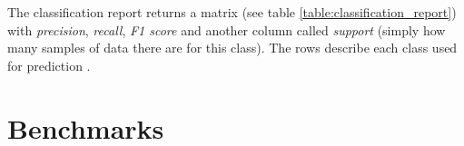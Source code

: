 The classification report returns a matrix (see table \ref{table:classification_report}) with \textit{precision}, 
\textit{recall}, \textit{F1 score} and another column called \textit{support} (simply how many samples of data there are for this class). 
The rows describe each class used for prediction \cite{sklearn_classification_report}.

\section{Benchmarks}
 